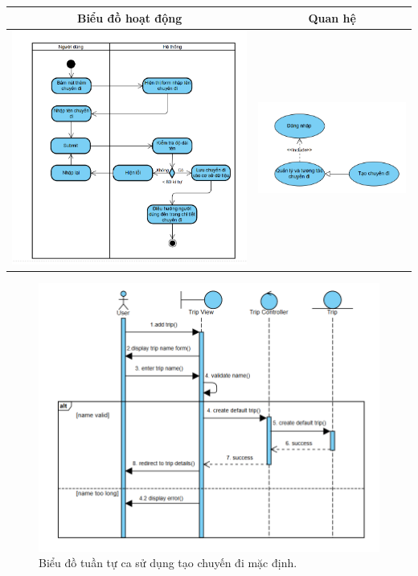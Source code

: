 \noindent 
\begin{tabular}{| c | c |}
    \hline
    \textbf{Biểu đồ hoạt động} & \textbf{Quan hệ} \\ 
    \hline
    \includegraphics[width=0.5\linewidth]{figures/c3/3-3-11-ad.png} 
    & 
    \includegraphics[width=0.45\linewidth]{figures/c3/3-3-11-rd.png} \\ 
    \hline
\end{tabular}


\vspace{0.8cm}

\begin{figure}[H]
    \centering  
    \includegraphics[width=1\textwidth]{figures/c3/3-3-11-sd.png}
    \caption{Biểu đồ tuần tự ca sử dụng tạo chuyến đi mặc định.}
    \label{fig:3-3-11-sequence-diagram}
\end{figure}
